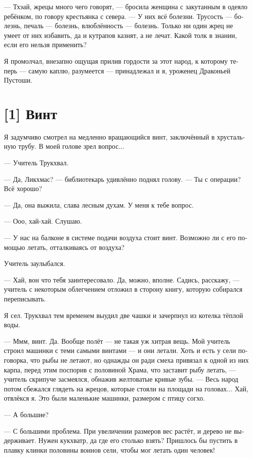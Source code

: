 \documentclass[a4paper,12pt,fleqn]{book}\usepackage{polyglossia}\setdefaultlanguage[babelshorthands=true]{russian}\setotherlanguage{english}\defaultfontfeatures{Ligatures=TeX,Mapping=tex-text}\usepackage{xcolor}\newcommand{\ml}[3]{#2}
\begin{document}
{--- Тхэай, жрецы много чего говорят, --- бросила женщина с закутанным в одеяло ребёнком, по говору крестьянка с севера.
--- У них всё болезни.
Трусость --- болезнь, печаль --- болезнь, влюблённость --- болезнь.
Только ни один жрец не умеет от них избавить, да и кутрапов казнят, а не лечат.
Какой толк в знании, если его нельзя применить?

Я промолчал, внезапно ощущая прилив гордости за этот народ, к которому теперь --- самую каплю, разумеется --- принадлежал и я, уроженец Драконьей Пустоши.

\section{[1] Винт}

Я задумчиво смотрел на медленно вращающийся винт, заключённый в хрустальную трубу. В моей голове зрел вопрос...

--- Учитель Трукхвал.

--- Да, Ликхмас? --- библиотекарь удивлённо поднял голову.
--- Ты с операции?
Всё хорошо?

--- Да, она выжила, слава лесным духам.
У меня к тебе вопрос.

--- Ооо, хай-хай.
Слушаю.

--- У нас на балконе в системе подачи воздуха стоит винт.
Возможно ли с его помощью летать, отталкиваясь от воздуха?

Учитель заулыбался.

--- Хай, вон что тебя заинтересовало.
Да, можно, вполне.
Садись, расскажу, --- учитель с некоторым облегчением отложил в сторону книгу, которую собирался переписывать.

Я сел.
Трукхвал тем временем выудил две чашки и зачерпнул из котелка тёплой воды.

--- Ммм, винт.
Да.
Вообще полёт --- не такая уж хитрая вещь.
Мой учитель строил машинки с теми самыми винтами --- и они летали.
Хоть и есть у сели поговорка, что рыбы не летают, но однажды он ради смеха привязал к одной из них карпа, перед этим поспорив с половиной Храма, что заставит рыбу летать, --- учитель скрипуче засмеялся, обнажив желтоватые кривые зубы.
--- Весь народ потом сбежался глядеть на жрецов, которые стояли на площади на головах...
Хай, отвлёкся я.
Это были маленькие машинки, размером с птицу согхо.

--- А большие?

--- С большими проблема.
При увеличении размеров вес растёт, и дерево не выдерживает.
Нужен кукхватр, да где его столько взять?
Пришлось бы пустить в плавку клинки половины воинов сели, чтобы мог летать один человек!

}
\end{document}
